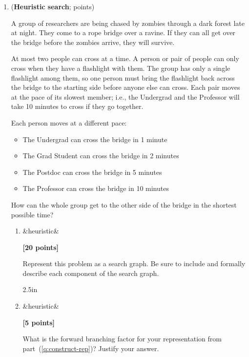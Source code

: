 \documentclass{article}
\newcounter{totalpoints}
\newcommand{\question}[2][]{(\textbf{#2}; \subtotal{#1})}
\newcommand{\subtotal}[1]{\newcounter{#1}\setcounter{#1}{0}\regtotcounter{#1}\total{#1} points}
\newcommand{\points}[2][]{{\addtocounter{totalpoints}{#2}\ifx&#1&\else\addtocounter{#1}{#2}\fi\textbf{[#2 points]}}}
\begin{document}
\begin{enumerate}
\begin{enumerate}
\begin{answer}{1in}
               \end{answer}

\end{enumerate}

\clearpage



\item \question[heuristic]{Heuristic search}

A group of researchers are being chased by zombies through a dark forest late at night.
They come to a rope bridge over a ravine.  If they can all get over the bridge before the zombies arrive, they will survive.

At most two people can cross at a time.  A person or pair of people can only cross when they have a flashlight with them.  The group has only a single flashlight among them, so one person must bring the flashlight back across the bridge to the starting side before anyone else can cross.  Each pair moves at the pace of its slowest member; i.e., the Undergrad and the Professor will take 10 minutes to cross if they go together.

Each person moves at a different pace:
\begin{itemize}
\item The Undergrad can cross the bridge in 1 minute
\item The Grad Student can cross the bridge in 2 minutes
\item The Postdoc can cross the bridge in 5 minutes
\item The Professor can cross the bridge in 10 minutes
\end{itemize}

How can the whole group get to the other side of the bridge in the shortest possible time?

\begin{enumerate}
\item \points[heuristic]{20} \label{q:construct-rep}
Represent this problem as a search graph.
Be sure to include and formally describe each component of the search graph.

\begin{answer}{2.5in}
\end{answer}


\item \points[heuristic]{5}
What is the forward branching factor for your representation from part~(\ref{q:construct-rep})?
Justify your answer.


\end{enumerate}
\end{enumerate}
\end{document}
